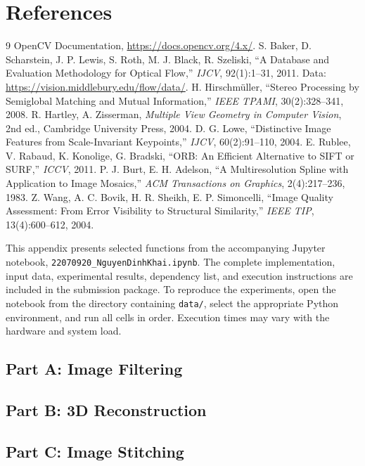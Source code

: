 \documentclass[a4paper,12pt]{article}
\begin{document}
\section{References}
\begingroup
\renewcommand{\section}[2]{}%
\begin{thebibliography}{9}
 OpenCV Documentation, \url{https://docs.opencv.org/4.x/}.
 S. Baker, D. Scharstein, J. P. Lewis, S. Roth, M. J. Black, R. Szeliski, ``A Database and Evaluation Methodology for Optical Flow,'' \emph{IJCV}, 92(1):1--31, 2011. Data: \url{https://vision.middlebury.edu/flow/data/}.
 H. Hirschmüller, ``Stereo Processing by Semiglobal Matching and Mutual Information,'' \emph{IEEE TPAMI}, 30(2):328--341, 2008.
 R. Hartley, A. Zisserman, \emph{Multiple View Geometry in Computer Vision}, 2nd ed., Cambridge University Press, 2004.
 D. G. Lowe, ``Distinctive Image Features from Scale-Invariant Keypoints,'' \emph{IJCV}, 60(2):91--110, 2004.
 E. Rublee, V. Rabaud, K. Konolige, G. Bradski, ``ORB: An Efficient Alternative to SIFT or SURF,'' \emph{ICCV}, 2011.
 P. J. Burt, E. H. Adelson, ``A Multiresolution Spline with Application to Image Mosaics,'' \emph{ACM Transactions on Graphics}, 2(4):217--236, 1983.
 Z. Wang, A. C. Bovik, H. R. Sheikh, E. P. Simoncelli, ``Image Quality Assessment: From Error Visibility to Structural Similarity,'' \emph{IEEE TIP}, 13(4):600--612, 2004.
\end{thebibliography}
\endgroup

\appendix
\section*{Appendix A: Selected Code Listings}
\setcounter{section}{1}              %
This appendix presents selected functions from the accompanying Jupyter notebook, \texttt{22070920\_NguyenDinhKhai.ipynb}. The complete implementation, input data, experimental results, dependency list, and execution instructions are included in the submission package. To reproduce the experiments, open the notebook from the directory containing \texttt{data/}, select the appropriate Python environment, and run all cells in order. Execution times may vary with the hardware and system load.
\subsection{Part A: Image Filtering}
\subsection{Part B: 3D Reconstruction}
\subsection{Part C: Image Stitching}
\end{document}
